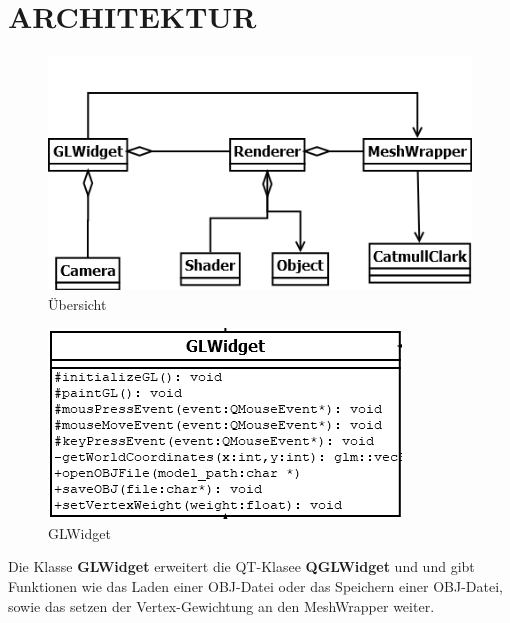	\section{\Large ARCHITEKTUR}
	
	\begin{figure}[H]
	\centering
	\includegraphics[width=0.7\linewidth]{uebersicht.png}
	\caption{Übersicht}
	\label{fig1}
	\end{figure}

	\begin{figure}[H]
	\centering
	\includegraphics[width=0.7\linewidth]{GLWidget.png}
	\caption{GLWidget}
	\label{fig2}
	\end{figure}
	
	Die Klasse \textbf{GLWidget} erweitert die QT-Klasee \textbf{QGLWidget} und und gibt Funktionen wie das Laden einer OBJ-Datei oder das Speichern einer OBJ-Datei, sowie das setzen der Vertex-Gewichtung an den MeshWrapper weiter.\newline\newline

